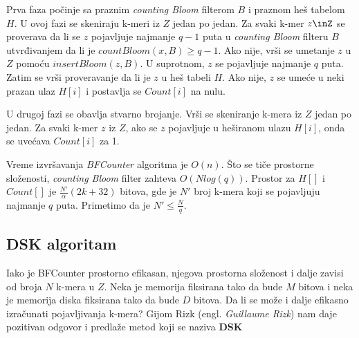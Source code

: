 \documentclass[12pt,oneside]{memoir}
\begin{document}
Prva faza počinje sa praznim \textit{counting Bloom} filterom $B$ i praznom heš tabelom $H$. U ovoj fazi se skeniraju k-meri iz $Z$ jedan po jedan. Za svaki k-mer $z\inZ$ se proverava da li se $z$ pojavljuje najmanje $q - 1$ puta u \textit{counting Bloom} filteru $B$ utvrđivanjem da li je $countBloom(x, B) \geq q-1$. Ako nije, vrši se umetanje $z$ u $Z$ pomoću $insertBloom(z, B)$. U suprotnom, $z$ se pojavljuje najmanje $q$ puta. Zatim se vrši proveravanje da li je $z$ u heš tabeli $H$. Ako nije, $z$ se umeće u neki prazan ulaz $H[i]$ i postavlja se $Count[i]$ na nulu. 

U drugoj fazi se obavlja stvarno brojanje. Vrši se skeniranje k-mera iz $Z$ jedan po jedan. Za svaki k-mer $z$ iz $Z$, ako se $z$ pojavljuje u heširanom ulazu $H[i]$, onda se uvećava $Count[i]$ za 1.

\begin{comment}

Detaljan pseudokod je prikazan na slici \ref{fig:7}:

\begin{figure}[h]
\centering
\texttt{[image: BFCounter5\_10.PNG]}
\caption{Prostorno efikasan algoritam za prebrojavanje k-mera koji broji samo k-mere koji se pojavljuju najmanje q puta.}
\label{fig:7}
\source{\cite{WingKinSung} str. 134, slika 5.10}
\end{figure}

\end{comment}

Vreme izvršavanja \textit{BFCounter} algoritma je $O(n)$. Što se tiče prostorne složenosti, \textit{counting Bloom} filter zahteva $O(N log(q))$. Prostor za $H[]$ i $Count[]$ je $\frac{N'}{\alpha}(2k + 32)$ bitova, gde je $N'$ broj k-mera koji se pojavljuju najmanje $q$ puta. Primetimo da je $N' \leq \frac{N}{q}$.

\newpage

\subsection{DSK algoritam}
Iako je BFCounter prostorno efikasan, njegova prostorna složenost i dalje zavisi od broja $N$ k-mera u $Z$. Neka je memorija fiksirana tako da bude $M$ bitova i neka je memorija diska fiksirana tako da bude $D$ bitova. Da li se može i dalje efikasno izračunati pojavljivanja k-mera? Gijom Rizk (engl. \textit{Guillaume Rizk}) nam daje pozitivan odgovor i predlaže metod koji se naziva \textbf{DSK}

\begin{comment}

, a čiji pseudokod je prikazan na slici \ref{fig:63}:

\begin{figure}[h]
\centering
\texttt{[image: DSK5\_11.PNG]}
\caption{DSK algoritam}
\label{fig:63}
\source{\cite{WingKinSung} str. 136, slika 5.11}
\end{figure}

\end{comment}
\end{document}

